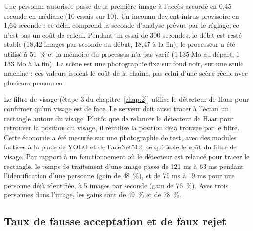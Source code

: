 \begin{maj}
Une personne autorisée passe de la première image à l'accès accordé en 0,45 seconde en médiane (10 essais sur 10). Un inconnu devient intrus provisoire en 1,64 seconde : ce délai comprend la seconde d'analyse prévue par le réglage, ce n'est pas un coût de calcul. Pendant un essai de 300 secondes, le débit est resté stable (18,42 images par seconde au début, 18,47 à la fin), le processeur a été utilisé à 51~\% et la mémoire du processus n'a pas varié (1\,135 Mo au départ, 1\,133 Mo à la fin). La scène est une photographie fixe sur fond noir, sur une seule machine : ces valeurs isolent le coût de la chaîne, pas celui d'une scène réelle avec plusieurs personnes.

Le filtre de visage (étape 3 du chapitre~\ref{chap:2}) utilise le détecteur de Haar pour confirmer qu'un visage est de face. Le serveur doit aussi tracer à l'écran un rectangle autour du visage. Plutôt que de relancer le détecteur de Haar pour retrouver la position du visage, il réutilise la position déjà trouvée par le filtre. Cette économie a été mesurée sur une photographie de test, avec des modules factices à la place de YOLO et de FaceNet512, ce qui isole le coût du filtre de visage. Par rapport à un fonctionnement où le détecteur est relancé pour tracer le rectangle, le temps de traitement d'une image passe de 121 ms à 63 ms pendant l'identification d'une personne (gain de 48~\%), et de 79 ms à 19 ms pour une personne déjà identifiée, à 5 images par seconde (gain de 76~\%). Avec trois personnes dans l'image, les gains sont de 49~\% et de 78~\%.
\end{maj}

\subsection{Taux de fausse acceptation et de faux rejet}

